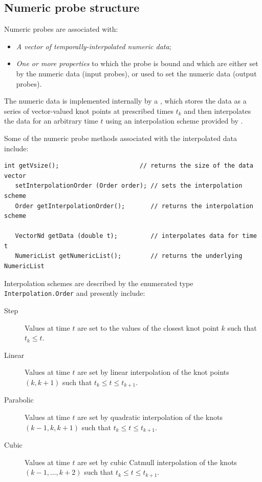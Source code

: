 \subsection{Numeric probe structure}
\label{NumericProbeStructure:sec}

Numeric probes are associated with:

\begin{itemize}

\item {\it A vector of temporally-interpolated numeric data};

\item {\it One or more properties} to which the probe is bound and
which are either set by the numeric data (input probes), or used to
set the numeric data (output probes).

\end{itemize}

The numeric data is implemented internally by a
, which stores the data
as a series of vector-valued knot points at prescribed times $t_k$ and
then interpolates the data for an arbitrary time $t$ using an
interpolation scheme provided by
.

Some of the numeric probe methods associated with the interpolated
data include:
%
\begin{lstlisting}[]
   int getVsize();                      // returns the size of the data vector
   setInterpolationOrder (Order order); // sets the interpolation scheme
   Order getInterpolationOrder();       // returns the interpolation scheme

   VectorNd getData (double t);         // interpolates data for time t
   NumericList getNumericList();        // returns the underlying NumericList
\end{lstlisting}
%
Interpolation schemes are described by the enumerated type {\tt
Interpolation.Order} and presently include:

\begin{description}

\item[Step]\mbox{}

Values at time $t$ are set to the values of the closest knot point
$k$ such that $t_k \le t$.

\item[Linear]\mbox{}

Values at time $t$ are set by linear interpolation of the knot points
$(k, k+1)$ such that $t_k \le t \le t_{k+1}$.

\item[Parabolic]\mbox{}

Values at time $t$ are set by quadratic interpolation of the knots
$(k-1, k, k+1)$ such that $t_k \le t \le t_{k+1}$.

\item[Cubic]\mbox{}

Values at time $t$ are set by cubic Catmull interpolation of the knots
$(k-1, \ldots, k+2)$ such that $t_k \le t \le t_{k+1}$.

\end{description}

